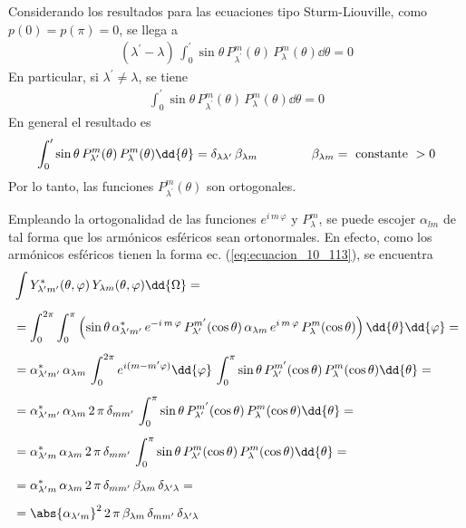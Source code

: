 Considerando los resultados para las ecuaciones tipo Sturm-Liouville, como $p(0) = p(\pi) = 0$, se llega a
\begin{align*}
(\lambda^{\prime} - \lambda) \, \int_{0}^{\prime} \sin \theta \, P_{\lambda^{\prime}}^{m} (\theta) \, P_{\lambda}^{m} (\theta) \dd{\theta} = 0
\end{align*}
En particular, si $\lambda^{\prime} \neq \lambda$, se tiene
\begin{align}
\int_{0}^{\prime} \sin \theta \, P_{\lambda^{\prime}}^{m} (\theta) \, P_{\lambda}^{m} (\theta) \dd{\theta} = 0
\label{eq:ecuacion_10_123}
\end{align}
En general el resultado es
\begin{align}
\int_{0}^{\prime} \sin \theta \, P_{\lambda^{\prime}}^{m} (\theta) \, P_{\lambda}^{m} (\theta) \dd{\theta} = \delta_{\lambda \lambda^{\prime}} \, \beta_{\lambda m} \hspace{1.5cm} \beta_{\lambda m} = \mbox{ constante } > 0
\label{eq:ecuacion_10_124}
\end{align}
Por lo tanto, las funciones $P_{\lambda^{\prime}}^{m} (\theta)$ son ortogonales.
\par
Empleando la ortogonalidad de las funciones $e^{i \, m \, \varphi}$ y $P_{\lambda}^{m}$, se puede escojer $\alpha_{l m}$ de tal forma que los armónicos esféricos sean ortonormales. En efecto, como los armónicos esféricos tienen la forma ec. (\ref{eq:ecuacion_10_113}), se encuentra
\begin{align}
&\int Y_{\lambda^\prime m^{\prime}}^{*} (\theta, \varphi) \, Y_{\lambda m} (\theta, \varphi) \dd{\Omega} = \nonumber \\[0.5em]
&= \int_{0}^{2 \pi} \int_{0}^{\pi} \left( \sin \theta \, \alpha_{\lambda^{\prime} m^{\prime}}^{*} \, e^{-i  \, m \, \varphi} \, P_{\lambda^{\prime}}^{m^{\prime}} (\cos \theta) \, \alpha_{\lambda m} \, e^{i  \, m \, \varphi} \, P_{\lambda}^{m} (\cos \theta) \right) \dd{\theta} \dd{\varphi} = \nonumber \\[0.5em]
&= \alpha_{\lambda^{\prime} m^{\prime}}^{*} \, \alpha_{\lambda m} \, \int_{0}^{2 \pi} e^{i (m - m^{\prime} \varphi)} \dd{\varphi} \, \int_{0}^{\pi} \sin \theta \, P_{\lambda^{\prime}}^{m^{\prime}} (\cos \theta) \, P_{\lambda}^{m} (\cos \theta) \dd{\theta} = \nonumber \\[0.5em]
&= \alpha_{\lambda^{\prime} m^{\prime}}^{*} \, \alpha_{\lambda m} \, 2 \, \pi \, \delta_{m m^{\prime}} \, \int_{0}^{\pi} \sin \theta \, P_{\lambda^{\prime}}^{m^{\prime}} (\cos \theta) \, P_{\lambda}^{m} (\cos \theta) \dd{\theta} = \nonumber \\[0.5em]
&= \alpha_{\lambda^{\prime} m}^{*} \, \alpha_{\lambda m} \, 2 \, \pi \, \delta_{m m^{\prime}} \, \int_{0}^{\pi} \sin \theta \, P_{\lambda^{\prime}}^{m} (\cos \theta) \, P_{\lambda}^{m} (\cos \theta) \dd{\theta} = \nonumber \\[0.5em]
&= \alpha_{\lambda^{\prime} m}^{*} \, \alpha_{\lambda m} \, 2 \, \pi \, \delta_{m m^{\prime}} \, \beta_{\lambda m} \, \delta_{\lambda^{\prime} \lambda} = \nonumber \\[0.5em]
&= \abs{\alpha_{\lambda^{\prime} m}}^{2} \, 2 \, \pi \, \beta_{\lambda m} \, \delta_{m m^{\prime}} \,\delta_{\lambda^{\prime} \lambda} \label{eq:ecuacion_10_125}
\end{align}
